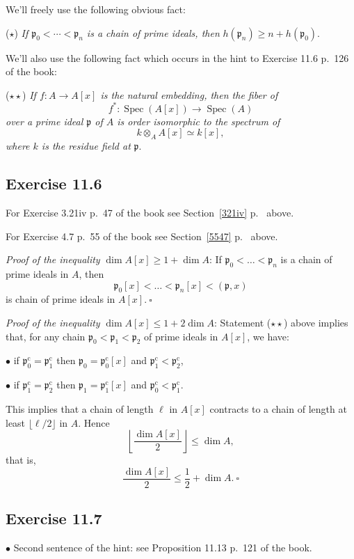 \documentclass[parskip=half,fontsize=12pt]{scrartcl}%
\newcommand{\oo}{\operatorname}\newcommand{\ooo}{\operatorname*}
\newcommand{\mf}{\mathfrak}
\newcommand{\ppp}{\mf p}
\begin{document}
We'll freely use the following obvious fact:

($\star$) \emph{If $\ppp_0<\cdots<\ppp_n$ is a chain of prime ideals, then} $h(\ppp_n)\ge n+h(\ppp_0)$. 

We'll also use the following fact which occurs in the hint to Exercise 11.6 p.~126 of the book:

($\star\star$) \emph{If $f:A\to A[x]$ is the natural embedding, then the fiber of} 
$$
f^*:\oo{Spec}(A[x])\to\oo{Spec}(A)
$$ 
\emph{over a prime ideal $\ppp$ of $A$ is order isomorphic to the spectrum of} 
$$
k\otimes_AA[x]\simeq k[x],
$$ 
\emph{where $k$ is the residue field at} $\ppp$.

\subsection{Exercise 11.6}%

For Exercise 3.21iv p.~47 of the book see Section~\ref{321iv} p.~\pageref{321iv} above. 

For Exercise 4.7 p.~55 of the book see Section~\ref{5547} p.~\pageref{5547} above.

\emph{Proof of the inequality} $\dim A[x]\ge1+\dim A$: If 
$
\ppp_0<\dots<\ppp_n
$ 
is a chain of prime ideals in $A$, then 
$$
\ppp_0[x]<\dots<\ppp_n[x]<(\ppp,x)
$$ 
is chain of prime ideals in $A[x].\ \square$

\emph{Proof of the inequality} $\dim A[x]\le1+2\dim A$: Statement ($\star\star$) above implies that, for any chain $\ppp_0<\ppp_1<\ppp_2$ of prime ideals in $A[x]$, we have:

$\bullet$ if $\ppp_0^{\oo c}=\ppp_1^{\oo c}$ then $\ppp_0=\ppp_0^{\oo c}[x]$ and $\ppp_1^{\oo c}<\ppp_2^{\oo c}$,

$\bullet$ if $\ppp_1^{\oo c}=\ppp_2^{\oo c}$ then $\ppp_1=\ppp_1^{\oo c}[x]$ and $\ppp_0^{\oo c}<\ppp_1^{\oo c}$.

This implies that a chain of length $\ell$ in $A[x]$ contracts to a chain of length at least $\lfloor\ell/2\rfloor$ in $A$. Hence 
$$
\left\lfloor\frac{\dim A[x]}2\right\rfloor\le\dim A,
$$ 
that is,
$$
\frac{\dim A[x]}2\le\frac12+\dim A.\ \square
$$

\subsection{Exercise 11.7}%

$\bullet$ Second sentence of the hint: see Proposition 11.13 p.~121 of the book. 
\end{document}

